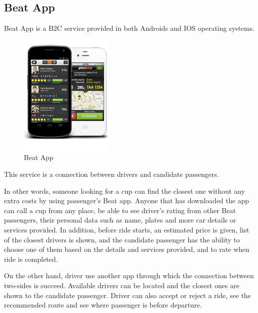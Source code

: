 \subsection{Beat App}
Beat App is a B2C service provided in both Androids and IOS operating systems.
\begin{figure}
	\begin{center}
		\includegraphics[scale=0.7]{images/beat_app.png}
	\end{center}
	\caption{Beat App}
\end{figure}
This service is a connection between drivers and candidate passengers.\par 
In other words, someone looking for a cup can find the closest one without any extra costs by using passenger's Beat app. Anyone that has downloaded the app can call a cup from any place, be able to see driver's rating from other Beat passengers, their personal data such as name, plates and more car details or services provided. In addition, before ride starts, an estimated price is given, list of the closest drivers is shown, and the candidate passenger has the ability to choose one of them based on the details and services provided, and to rate when ride is completed. \par
On the other hand, driver use another app through which the connection between two-sides is succeed. Available drivers can be located and the closest ones are shown to the candidate passenger. Driver can also accept or reject a ride, see the recommended route and see where passenger is before departure.

